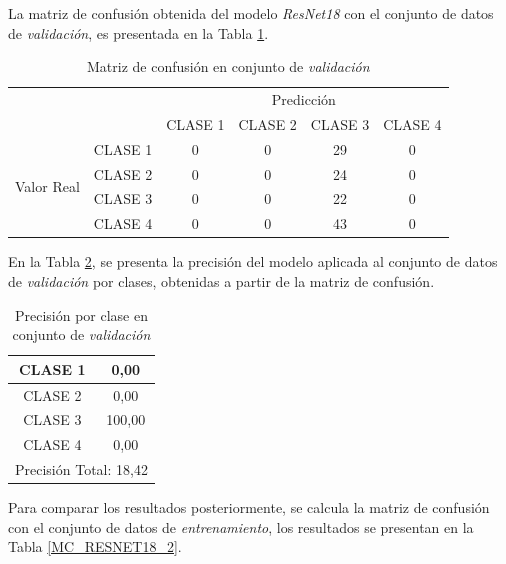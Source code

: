 La matriz de confusión obtenida del modelo \textit{ResNet18} con el conjunto de datos de \textit{validación}, es presentada en la Tabla \ref*{MC_RESNET18}.\\

\begin{table}[htbp]
	\centering
	\resizebox{10cm}{!} {
	\begin{tabular}{|c|l|c|c|c|c|}
		\hline
		\multicolumn{2}{|c|}{\multirow{2}[4]{*}{}} & \multicolumn{4}{c|}{Predicción} \bigstrut\\
		\cline{3-6}    \multicolumn{2}{|c|}{} & CLASE 1 & CLASE 2 & CLASE 3 & CLASE 4 \bigstrut\\
		\hline
		\multirow{4}[8]{*}{\begin{sideways}Valor Real\end{sideways}} & CLASE 1 & 0     & 0     & 29    & 0 \bigstrut\\
		\cline{2-6}          & CLASE 2 & 0     & 0     & 24    & 0 \bigstrut\\
		\cline{2-6}          & CLASE 3 & 0     & 0     & 22    & 0 \bigstrut\\
		\cline{2-6}          & CLASE 4 & 0     & 0     & 43    & 0 \bigstrut\\
		\hline
	\end{tabular}%
	}
	\caption{Matriz de confusión en conjunto de \textit{validación}}
	\label{MC_RESNET18}
\end{table}

En la Tabla \ref*{clase_RESNET18}, se presenta la precisión del modelo aplicada al conjunto de datos de \textit{validación} por clases, obtenidas a partir de la matriz de confusión.

\newpage
\begin{table}[htbp]
	\centering
	\begin{tabular}{|c|c|}
		\hline
		CLASE 1 & 0,00 \bigstrut\\
		\hline
		CLASE 2 & 0,00 \bigstrut\\
		\hline
		CLASE 3 & 100,00 \bigstrut\\
		\hline
		CLASE 4 & 0,00 \bigstrut\\
		\hline
		\multicolumn{2}{|c|}{Precisión Total: 18,42} \bigstrut\\
		\hline
	\end{tabular}	
	\caption{Precisión por clase en conjunto de \textit{validación}}
	\label{clase_RESNET18}
\end{table}%


Para comparar los resultados posteriormente, se calcula la matriz de confusión con el conjunto de datos de \textit{entrenamiento}, los resultados se presentan en la Tabla \ref{MC_RESNET18_2}.

